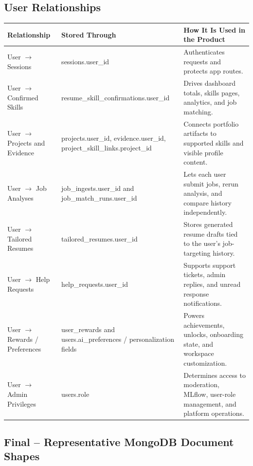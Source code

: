 \documentclass[11pt]{article}
\begin{document}
\subsection*{User Relationships}
\begin{table}[H]
  \renewcommand{\arraystretch}{1.2}
  \begin{tabularx}{\linewidth}{@{}p{1.8in}YY@{}}
    \toprule
    \textbf{Relationship} & \textbf{Stored Through} & \textbf{How It Is Used in the Product} \\
    \midrule
    User $\rightarrow$ Sessions & sessions.user\_id & Authenticates requests and protects app routes. \\
    User $\rightarrow$ Confirmed Skills & resume\_skill\_confirmations.user\_id & Drives dashboard totals, skills pages, analytics, and job matching. \\
    User $\rightarrow$ Projects and Evidence & projects.user\_id, evidence.user\_id, project\_skill\_links.project\_id & Connects portfolio artifacts to supported skills and visible profile content. \\
    User $\rightarrow$ Job Analyses & job\_ingests.user\_id and job\_match\_runs.user\_id & Lets each user submit jobs, rerun analysis, and compare history independently. \\
    User $\rightarrow$ Tailored Resumes & tailored\_resumes.user\_id & Stores generated resume drafts tied to the user's job-targeting history. \\
    User $\rightarrow$ Help Requests & help\_requests.user\_id & Supports support tickets, admin replies, and unread response notifications. \\
    User $\rightarrow$ Rewards / Preferences & user\_rewards and users.ai\_preferences / personalization fields & Powers achievements, unlocks, onboarding state, and workspace customization. \\
    User $\rightarrow$ Admin Privileges & users.role & Determines access to moderation, MLflow, user-role management, and platform operations. \\
    \bottomrule
  \end{tabularx}
\end{table}

\subsection*{Final -- Representative MongoDB Document Shapes}
\end{document}
